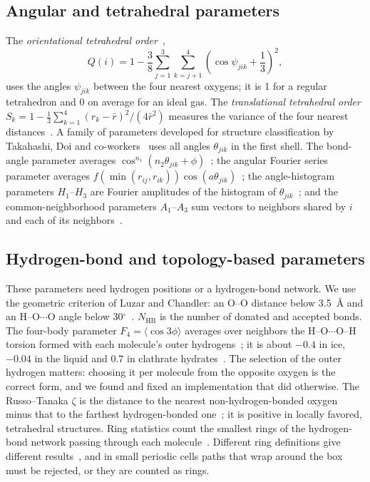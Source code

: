 \documentclass[11pt,a4paper]{article}
\begin{document}
\subsection{Angular and tetrahedral parameters}
The \emph{orientational tetrahedral order}~\cite{CHAU_1998,Errington2001},
\begin{equation}
  Q(i)=1-\frac38\sum_{j=1}^{3}\sum_{k=j+1}^{4}\left(\cos\psi_{jik}+\frac13\right)^2,
\end{equation}
uses the angles $\psi_{jik}$ between the four nearest oxygens; it is 1 for a
regular tetrahedron and 0 on average for an ideal gas. The
\emph{translational tetrahedral order}
$S_k=1-\frac13\sum_{k=1}^4(r_k-\bar r)^2/(4\bar r^2)$ measures the variance of
the four nearest distances~\cite{CHAU_1998}. A family of parameters developed
for structure classification by Takahashi, Doi and
co-workers~\cite{Doi2020,Doi2021,Takahashi2023} uses all angles $\theta_{jik}$
in the first shell. The bond-angle parameter averages
$\cos^{n_1}(n_2\theta_{jik}+\phi)$~\cite{Ackland2006,Takahashi2023}; the
angular Fourier series parameter averages
$f(\min(r_{ij},r_{ik}))\cos(a\theta_{jik})$~\cite{Bartk2013,Takahashi2023};
the angle-histogram parameters $H_1$--$H_3$ are Fourier amplitudes of the
histogram of $\theta_{jik}$~\cite{Takahashi2023}; and the common-neighborhood
parameters $A_1$--$A_3$ sum vectors to neighbors shared by $i$ and each of its
neighbors~\cite{Honeycutt1987,Radhi2017,Takahashi2023}.

\subsection{Hydrogen-bond and topology-based parameters}
These parameters need hydrogen positions or a hydrogen-bond network. We use
the geometric criterion of Luzar and Chandler: an O--O distance below
3.5~\AA{} and an H--O$\cdots$O angle below 30$^\circ$~\cite{Luzar1996}.
$N_\mathrm{HB}$ is the number of donated and accepted bonds. The four-body
parameter $F_4=\langle\cos3\phi\rangle$ averages over neighbors the H--O$\cdots$O--H
torsion formed with each molecule's outer hydrogens~\cite{Rodger1996}; it is
about $-0.4$ in ice, $-0.04$ in the liquid and $0.7$ in clathrate
hydrates~\cite{Rodger1996,Jimnezngeles2014}. The selection of the outer
hydrogen matters: choosing it per molecule from the opposite oxygen is the
correct form, and we found and fixed an implementation that did otherwise.
The Russo--Tanaka $\zeta$ is the distance to the nearest non-hydrogen-bonded
oxygen minus that to the farthest hydrogen-bonded one~\cite{Russo2014}; it
is positive in locally favored, tetrahedral structures. Ring statistics count
the smallest rings of the hydrogen-bond network passing through each
molecule~\cite{King1967,Franzblau1991,Matsumoto2007}. Different ring
definitions give different results~\cite{Formanek2020}, and in small periodic
cells paths that wrap around the box must be rejected, or they are counted as
rings.
\end{document}

